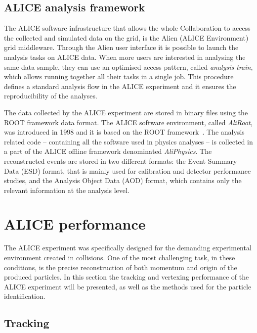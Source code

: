 %
\subsection{ALICE analysis framework} \label{sec:anal_frame}

The ALICE software infrastructure that allows the whole Collaboration to access the collected and
simulated data on the grid, is the Alien (ALICE Environment)~\cite{alien} grid middleware.
Through the Alien user interface it is possible to launch the analysis tasks on ALICE data. 
When more users are interested in analysing the same data sample, they can use an optimised
access pattern, called \textit{analysis train}, which allows running together all their tasks in a
single job.
This procedure defines a standard analysis flow in the ALICE experiment and it ensures the
reproducibility of the analyses.

The data collected by the ALICE experiment are stored in binary files using the ROOT framework data 
format.
The ALICE software environment, called \textit{AliRoot}, was introduced in 1998 and it is based on 
the ROOT framework~\cite{root}.
The analysis related code -- containing all the software used in physics analyses -- is collected
in a part of the ALICE offline framework denominated \textit{AliPhysics}.
The reconstructed events are stored in two different formats: the Event Summary Data (ESD) format, 
that is mainly used for calibration and detector performance studies, and the Analysis Object Data 
(AOD) format, which contains only the relevant information at the analysis level.

%
%
\section{ALICE performance} \label{sec:ali_perf}

The ALICE experiment was specifically designed for the demanding experimental environment created in 
\PbPb collisions. 
One of the most challenging task, in these conditions, is the precise reconstruction of both momentum
and origin of the produced particles.
In this section the tracking and vertexing performance of the ALICE experiment will be presented,
as well as the methods used for the particle identification.

%
\subsection{Tracking} \label{sec:tarcking}

